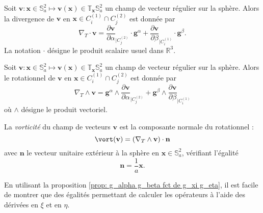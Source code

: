 \begin{definition}
Soit $\mathbf{v} : \mathbf{x} \in \mathbb{S}_a^2 \mapsto \mathbf{v}(\mathbf{x}) \in \mathbb{T}_{\mathbf{x}} \mathbb{S}_a^2$ un champ de vecteur régulier sur la sphère. Alors la divergence de $\mathbf{v}$ en $\mathbf{x} \in C_i^{(1)} \cap C_j^{(2)}$ est donnée par
\begin{equation}
\nabla_T \cdot \mathbf{v} = \dfrac{\partial \mathbf{v}}{\partial \alpha}_{|C^{(2)}_j} \cdot \mathbf{g}^{\alpha} + \dfrac{\partial \mathbf{v}}{\partial \beta}_{|C^{(1)}_i} \cdot \mathbf{g}^{\beta}.
\end{equation}
\label{def:divergence}
La notation $\cdot$ désigne le produit scalaire usuel dans $\mathbb{R}^3$.
\end{definition}

\begin{definition}
Soit $\mathbf{v} : \mathbf{x} \in \mathbb{S}_a^2 \mapsto \mathbf{v}(\mathbf{x}) \in \mathbb{T}_{\mathbf{x}} \mathbb{S}_a^2$ un champ de vecteur régulier sur la sphère. Alors le rotationnel de $\mathbf{v}$ en $\mathbf{x} \in C_i^{(1)} \cap C_j^{(2)}$ est donnée par
\begin{equation}
\nabla_T \wedge \mathbf{v} =  \mathbf{g}^{\alpha} \wedge \dfrac{\partial \mathbf{v}}{\partial \alpha}_{|C^{(2)}_j} + \mathbf{g}^{\beta} \wedge \dfrac{\partial \mathbf{v}}{\partial \beta}_{|C^{(1)}_i}
\end{equation}
où $\wedge$ désigne le produit vectoriel.
\label{def:rotationnel}
\end{definition}
La \textit{vorticité} du champ de vecteurs $\mathbf{v}$ est la composante normale du rotationnel :
\begin{equation}
\vort ( \mathbf{v} ) = \left( \nabla_T \wedge \mathbf{v} \right) \cdot \mathbf{n}
\label{eq:vorticité}
\end{equation}
avec $\mathbf{n}$ le vecteur unitaire extérieur à la sphère en $\mathbf{x} \in \mathbb{S}_a^2$, vérifiant l'égalité
\begin{equation}
\mathbf{n} = \dfrac{1}{a} \mathbf{x}.
\end{equation}

En utilisant la proposition \ref{prop: g_alpha g_beta fct de g_xi g_eta}, il est facile de montrer que des égalités permettant de calculer les opérateurs à l'aide des dérivées en $\xi$ et en $\eta$.

